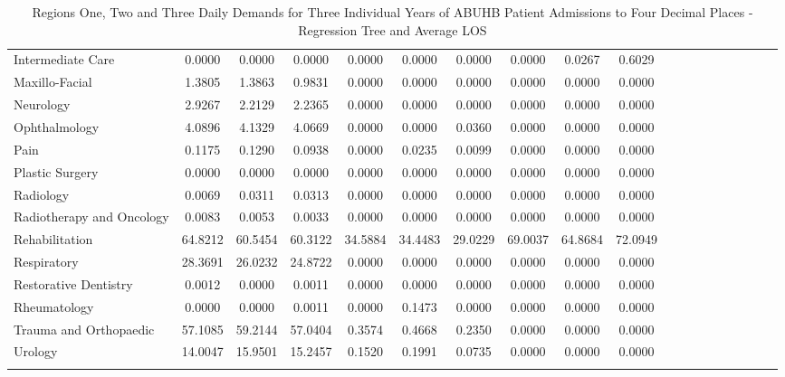 \documentclass[thesis.tex]{subfiles}
\begin{document}
\begin{landscape}
\begin{table}[h!]
{\begin{tabular}{lcccccccccccccccccc}
Intermediate Care&	0.0000&	0.0000&	0.0000&	0.0000&	0.0000&	0.0000&	0.0000&	0.0267&	0.6029\\
Maxillo-Facial&	1.3805&	1.3863&	0.9831&	0.0000&	0.0000&	0.0000&	0.0000&	0.0000&	0.0000\\
Neurology &	2.9267&	2.2129&	2.2365&	0.0000&	0.0000&	0.0000&	0.0000&	0.0000&	0.0000\\
Ophthalmology &	4.0896&	4.1329&	4.0669&	0.0000&	0.0000&	0.0360&	0.0000&	0.0000&	0.0000\\
Pain &	0.1175&	0.1290&	0.0938&	0.0000&	0.0235&	0.0099&	0.0000&	0.0000&	0.0000\\
Plastic Surgery&	0.0000&	0.0000&	0.0000&	0.0000&	0.0000&	0.0000&	0.0000&	0.0000&	0.0000\\
Radiology &	0.0069&	0.0311&	0.0313&	0.0000&	0.0000&	0.0000&	0.0000&	0.0000&	0.0000\\
Radiotherapy and Oncology&	0.0083&	0.0053&	0.0033&	0.0000&	0.0000&	0.0000&	0.0000&	0.0000&	0.0000\\
Rehabilitation &	64.8212&	60.5454&	60.3122&	34.5884&	34.4483&	29.0229&	69.0037&	64.8684&	72.0949\\
Respiratory &	28.3691&	26.0232&	24.8722&	0.0000&	0.0000&	0.0000&	0.0000&	0.0000&	0.0000\\
Restorative Dentistry&	0.0012&	0.0000&	0.0011&	0.0000&	0.0000&	0.0000&	0.0000&	0.0000&	0.0000\\
Rheumatology &	0.0000&	0.0000&	0.0011&	0.0000&	0.1473&	0.0000&	0.0000&	0.0000&	0.0000\\
Trauma and Orthopaedic&	57.1085&	59.2144&	57.0404&	0.3574&	0.4668&	0.2350&	0.0000&	0.0000&	0.0000\\
Urology &	14.0047&	15.9501&	15.2457&	0.1520&	0.1991&	0.0735&	0.0000&	0.0000&	0.0000\\
\\\bottomrule
\end{tabular}  } 
\caption{Regions One, Two and Three Daily Demands for Three Individual Years of ABUHB Patient Admissions to Four Decimal Places - Regression Tree and Average LOS}
    \label{apptab:LinkedDemands2a}
\end{table}

\begin{table}[h!]
    \centering{}
\end{table}
\end{landscape}
\end{document}
